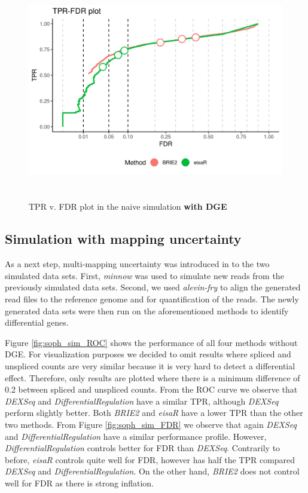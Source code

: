 \begin{figure}[!htb]
\begin{center}
\includegraphics[width=6in,height=3.8in]{../figures/simulation/naive_simulation_DGE_FDR.png}
\end{center}
\caption{TPR v. FDR plot in the naive simulation \textbf{with DGE}}
\label{fig:naive_sim_DGE_FDR}
\end{figure}
\FloatBarrier

\subsection{Simulation with mapping uncertainty} \label{soph_sim}
As a next step, multi-mapping uncertainty was introduced in to the two simulated data sets. First, \emph{minnow} was used to simulate new reads from the previously simulated data sets. Second, we used \emph{alevin-fry} to align the generated read files to the reference genome and for quantification of the reads. The newly generated data sets were then run on the aforementioned methods to identify differential genes. 

Figure \ref{fig:soph_sim_ROC} shows the performance of all four methods without DGE. For visualization purposes we decided to omit results where spliced and unspliced counts are very similar because it is very hard to detect a differential effect. Therefore, only results are plotted where there is a minimum difference of 0.2 between spliced and unspliced counts. From the ROC curve we observe that \emph{DEXSeq} and \emph{DifferentialRegulation} have a similar TPR, although \emph{DEXSeq} perform slightly better. Both \emph{BRIE2} and \emph{eisaR} have a lower TPR than the other two methods. From Figure \ref{fig:soph_sim_FDR} we observe that again \emph{DEXSeq} and \emph{DifferentialRegulation} have a similar performance profile. However, \emph{DifferentialRegulation} controls better for FDR than \emph{DEXSeq}. Contrarily to before, \emph{eisaR} controls quite well for FDR, however has half the TPR compared \emph{DEXSeq} and \emph{DifferentialRegulation}. On the other hand, \emph{BRIE2} does not control well for FDR as there is strong inflation.

